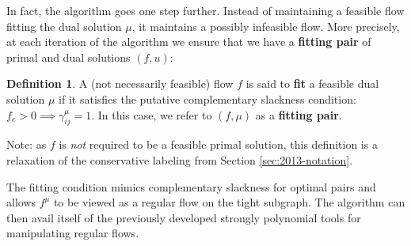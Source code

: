 \documentclass[11pt]{article}
\theoremstyle{definition}
\newtheorem{definition}{Definition}[section]
\theoremstyle{definition}
\newcommand{\giij}{\gamma_{ij}^{\mu}}
\begin{document}
	In fact, the algorithm goes one step further. Instead of maintaining a feasible flow
	fitting the dual solution $\mu$, it maintains a possibly infeasible flow. More precisely,
    at each iteration of the algorithm we ensure that we have a \textbf{fitting pair}
	of primal and dual solutions $(f,u)$:
	\begin{definition}
	A (not necessarily feasible) flow $f$ is said to \textbf{fit} a feasible dual solution $\mu$
    if it satisfies the putative complementary slackness condition: $f_e > 0 \implies \giij = 1$.
    In this case, we refer to $(f, \mu)$ as a \textbf{fitting pair}.
	\end{definition}
    Note: as $f$ is \emph{not} required to be a feasible primal solution,
    this definition is a relaxation of the
	conservative labeling from Section \ref{sec:2013-notation}.
	
	The fitting condition mimics complementary
	slackness for optimal pairs and allows $f^\mu$ to be viewed as a regular flow
	on the tight subgraph. The algorithm can then avail itself of the previously developed
	strongly polynomial tools for manipulating regular flows.
    
\end{document}

